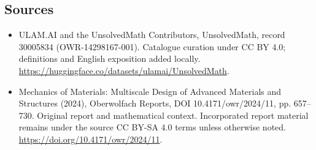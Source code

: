 \documentclass[11pt]{article}
\begin{document}
\subsection{Sources}
\begin{itemize}
\item[\hypertarget{source:30005834:1}{S1}] ULAM.AI and the UnsolvedMath Contributors, UnsolvedMath, record 30005834 (OWR-14298167-001). Catalogue curation under CC BY 4.0; definitions and English exposition added locally.
\url{https://huggingface.co/datasets/ulamai/UnsolvedMath}.
\item[\hypertarget{source:30005834:2}{S2}] Mechanics of Materials: Multiscale Design of Advanced Materials and Structures (2024), Oberwolfach Reports, DOI 10.4171/owr/2024/11, pp. 657--730. Original report and mathematical context. Incorporated report material remains under the source CC BY-SA 4.0 terms unless otherwise noted.
\url{https://doi.org/10.4171/owr/2024/11}.
\end{itemize}
\label{end:30005834}
\end{document}
